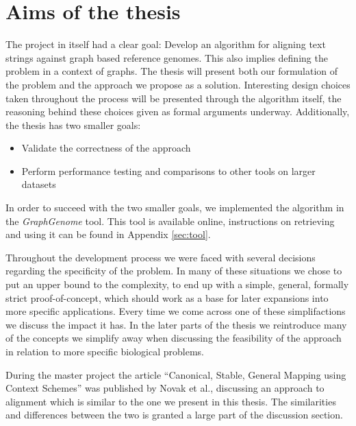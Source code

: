 \documentclass[thesis.tex]{subfiles}
\begin{document}
\section{Aims of the thesis}
The project in itself had a clear goal: Develop an algorithm for aligning text strings against graph based reference genomes. This also implies defining the problem in a context of graphs. The thesis will present both our formulation of the problem and the approach we propose as a solution. Interesting design choices taken throughout the process will be presented through the algorithm itself, the reasoning behind these choices given as formal arguments underway. Additionally, the thesis has two smaller goals:
\begin{itemize}
  \item Validate the correctness of the approach
  \item Perform performance testing and comparisons to other tools on larger datasets
\end{itemize}
In order to succeed with the two smaller goals, we implemented the algorithm in the \textit{GraphGenome} tool. This tool is available online, instructions on retrieving and using it can be found in Appendix \ref{sec:tool}.\\
\par\noindent
Throughout the development process we were faced with several decisions regarding the specificity of the problem. In many of these situations we chose to put an upper bound to the complexity, to end up with a simple, general, formally strict proof-of-concept, which should work as a base for later expansions into more specific applications.  Every time we come across one of these simplifactions we discuss the impact it has. In the later parts of the thesis we reintroduce many of the concepts we simplify away when discussing the feasibility of the approach in relation to more specific biological problems.\\
\par\noindent
During the master project the article ``Canonical, Stable, General Mapping using Context Schemes'' was published by Novak et al., discussing an approach to alignment which is similar to the one we present in this thesis. The similarities and differences between the two is granted a large part of the discussion section.
\end{document}

